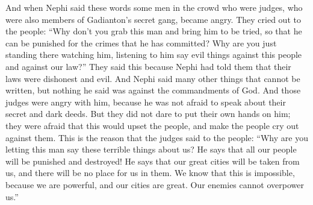 And when Nephi said these words some men in the crowd who were judges, who were also members of Gadianton's secret gang, became angry. They cried out to the people: ``Why don't you grab this man and bring him to be tried, so that he can be punished for the crimes that he has committed?
\bverse \iffalse Why seest thou this man, and hearest him revile against this people and against our law? \fi
Why are you just standing there watching him, listening to him say evil things against this people and against our law?''
\bverse \iffalse For behold, Nephi had spoken unto them concerning the corruptness of their law; yea, many things did Nephi speak which cannot be written; and nothing did he speak which was contrary to the commandments of God. \fi
They said this because Nephi had told them that their laws were dishonest and evil. And Nephi said many other things that cannot be written, but nothing he said was against the commandments of God.
\bverse \iffalse And those judges were angry with him because he spake plainly unto them concerning their secret works of darkness; nevertheless, they durst not lay their own hands upon him, for they feared the people lest they should cry out against them. \fi
And those judges were angry with him, because he was not afraid to speak about their secret and dark deeds. But they did not dare to put their own hands on him; they were afraid that this would upset the people, and make the people cry out against them.
\bverse \iffalse Therefore they did cry unto the people, saying: Why do you suffer this man to revile against us? For behold he doth condemn all this people, even unto destruction; yea, and also that these our great cities shall be taken from us, that we shall have no place in them. \fi
This is the reason that the judges said to the people: ``Why are you letting this man say these terrible things about us? He says that all our people will be punished and destroyed! He says that our great cities will be taken from us, and there will be no place for us in them.
\bverse \iffalse And now we know that this is impossible, for behold, we are powerful, and our cities great, therefore our enemies can have no power over us. \fi
We know that this is impossible, because we are powerful, and our cities are great. Our enemies cannot overpower us.''
\bverse \iffalse And it came to pass that thus they did stir up the people to anger against Nephi, and raised contentions among them; for there were some who did cry out: Let this man alone, for he is a good man, and those things which he saith will surely come to pass except we repent; \fi
